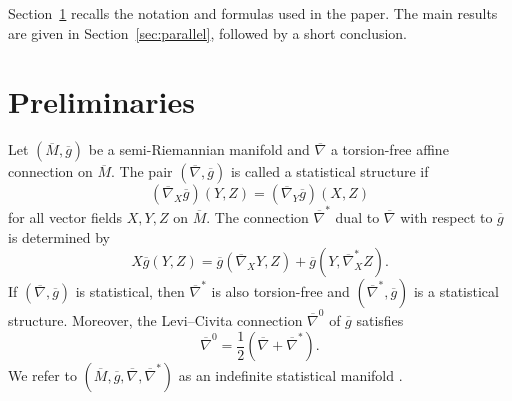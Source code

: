 \documentclass[11pt,a4paper]{article}
\theoremstyle{remark}
\theoremstyle{definition}
\begin{document}
Section~\ref{sec:preliminaries} recalls the notation and formulas used in the
paper. The main results are given in Section~\ref{sec:parallel}, followed by
a short conclusion.

\section{Preliminaries}\label{sec:preliminaries}

Let $(\overline{M},\overline{g})$ be a semi-Riemannian manifold and
$\overline{\nabla}$ a torsion-free affine connection on $\overline{M}$.
The pair $(\overline{\nabla},\overline{g})$ is called a statistical
structure if
\begin{equation}\label{eq:codazzi}
(\overline{\nabla}_{X}\overline{g})(Y,Z)
=
(\overline{\nabla}_{Y}\overline{g})(X,Z)
\end{equation}
for all vector fields $X,Y,Z$ on $\overline{M}$. The connection
$\overline{\nabla}^{*}$ dual to $\overline{\nabla}$ with respect to
$\overline{g}$ is determined by
\begin{equation}\label{eq:duality}
X\overline{g}(Y,Z)
=
\overline{g}(\overline{\nabla}_{X}Y,Z)
+
\overline{g}(Y,\overline{\nabla}^{*}_{X}Z).
\end{equation}
If $(\overline{\nabla},\overline{g})$ is statistical, then
$\overline{\nabla}^{*}$ is also torsion-free and
$(\overline{\nabla}^{*},\overline{g})$ is a statistical structure.
Moreover, the Levi--Civita connection $\overline{\nabla}^{0}$ of
$\overline{g}$ satisfies
\begin{equation}\label{eq:levicivita-mean}
\overline{\nabla}^{0}
=
\frac{1}{2}
\left(
\overline{\nabla}
+
\overline{\nabla}^{*}
\right).
\end{equation}
We refer to
$(\overline{M},\overline{g},\overline{\nabla},
\overline{\nabla}^{*})$
as an indefinite statistical manifold
\cite{Amari1985,Lauritzen1987,Vos1989,Furuhata2009}.
\end{document}

